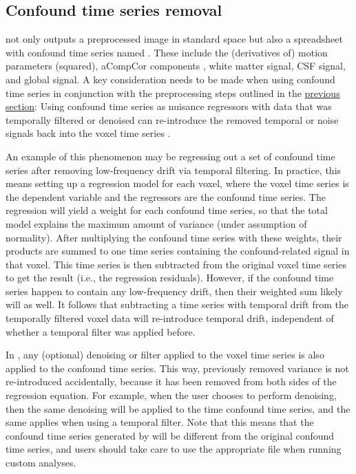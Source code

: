 \subsection{Confound time series removal}

 not only outputs a preprocessed image in standard space but also a spreadsheet with confound time series named . These include the (derivatives of) motion parameters (squared), aCompCor components \parencite{behzadi2007}, white matter signal, CSF signal, and global signal. A key consideration needs to be made when using  confound time series in conjunction with the preprocessing steps outlined in the \hyperref[sec:preprocessing]{previous section}: Using confound time series as nuisance regressors with data that was temporally filtered or denoised can re-introduce the removed temporal or noise signals back into the voxel time series \parencite{hallquist2013}.

An example of this phenomenon may be regressing out a set of  confound time series after removing low-frequency drift via temporal filtering. In practice, this means setting up a regression model for each voxel, where the voxel time series is the dependent variable and the regressors are the confound time series. The regression will yield a weight for each confound time series, so that the total model explains the maximum amount of variance (under assumption of normality). After multiplying the confound time series with these weights, their products are summed to one time series containing the confound-related signal in that voxel. This time series is then subtracted from the original voxel time series to get the result (i.e., the regression residuals). However, if the confound time series happen to contain any low-frequency drift, then their weighted sum likely will as well. It follows that subtracting a time series with temporal drift from the temporally filtered voxel data will re-introduce temporal drift, independent of whether a temporal filter was applied before.

In , any (optional) denoising or filter applied to the voxel time series is also applied to the  confound time series. This way, previously removed variance is not re-introduced accidentally, because it has been removed from both sides of the regression equation. For example, when the user chooses to perform  denoising, then the same denoising will be applied to the time  confound time series, and the same applies when using a temporal filter. Note that this means that the confound time series generated by  will be different from the original  confound time series, and users should take care to use the appropriate file when running custom analyses.
